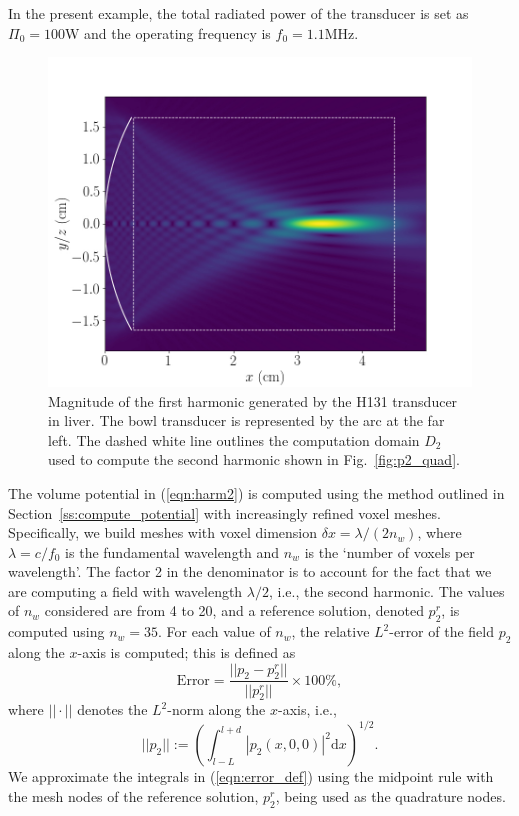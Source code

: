 \documentclass[11pt]{article}
\numberwithin{equation}{section}
\newcommand{\sd}{\mbox{d}}
\begin{document}
In the present example, the total radiated power of the
transducer is set as $\Pi_0 = 100$W and the operating frequency is $f_0=1.1$MHz.
\begin{figure}[h!]
    \centering
    \includegraphics[width=\linewidth]{Figure2}
    \caption{Magnitude of the first harmonic generated by the H131 transducer
    in liver. The bowl transducer is represented by the arc at the far left.
    The dashed white line outlines the computation domain $D_2$ used to compute
    the second harmonic shown in Fig.~\ref{fig:p2_quad}.}
    \label{fig:H131_p1}
\end{figure}

The volume potential in (\ref{eqn:harm2}) is computed using the method outlined 
in Section~\ref{ss:compute_potential} with increasingly refined voxel meshes.
Specifically, we build meshes with voxel dimension $\delta x = \lambda / (2n_w)$,
where $\lambda = c / f_0$ is the fundamental wavelength and $n_w$ is the 
`number of voxels per wavelength'. The factor 2 in the denominator is to account
for the fact that we are computing a field with wavelength $\lambda/2$, i.e.,
the second harmonic. The values of $n_w$ considered are from 4 to 20, and a 
reference solution, denoted $p_2^r$, is computed using $n_w=35$. For each value 
of $n_w$, the relative $L^2$-error of the field $p_2$ along the $x$-axis is 
computed; this is defined as
\begin{equation}
    \text{Error} = \frac{||p_2 - p_2^r||}{||p_2^r||}\times 100\%,
    \label{eqn:error_def}
\end{equation}
where $||\cdot||$ denotes the $L^2$-norm along the $x$-axis, i.e., 
\begin{equation}
    ||p_2|| := \left(\int_{l-L}^{l+d}|p_2(x,0,0)|^2\sd x\right)^{1/2}.
\end{equation}
We approximate the integrals in (\ref{eqn:error_def}) using the midpoint rule
with the mesh nodes of the reference solution, $p_2^r$, being used as the 
quadrature nodes.
\end{document}
